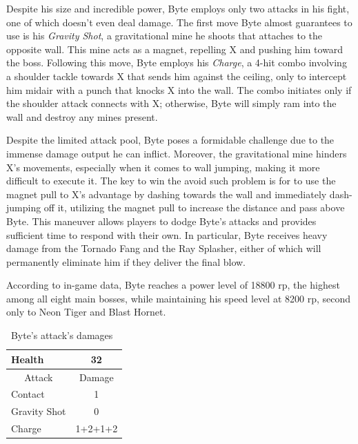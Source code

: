 Despite his size and incredible power, Byte employs only two attacks in his fight, one of which doesn't even deal damage. The first move Byte almost guarantees to use is his \emph{Gravity Shot}, a gravitational mine he shoots that attaches to the opposite wall. This mine acts as a magnet, repelling X and pushing him toward the boss. Following this move, Byte employs his \emph{Charge}, a 4-hit combo involving a shoulder tackle towards X that sends him against the ceiling, only to intercept him midair with a punch that knocks X into the wall. The combo initiates only if the shoulder attack connects with X; otherwise, Byte will simply ram into the wall and destroy any mines present.


Despite the limited attack pool, Byte poses a formidable challenge due to the immense damage output he can inflict. Moreover, the gravitational mine hinders X's movements, especially when it comes to wall jumping, making it more difficult to execute it. The key to win the avoid such problem is for to use the magnet pull to X's advantage by dashing towards the wall and immediately dash-jumping off it, utilizing the magnet pull to increase the distance and pass above Byte. This maneuver allows players to dodge Byte's attacks and provides sufficient time to respond with their own. In particular, Byte receives heavy damage from the Tornado Fang and the Ray Splasher, either of which will permanently eliminate him if they deliver the final blow.

According to in-game data, Byte reaches a power level of 18800 rp, the highest among all eight main bosses, while maintaining his speed level at 8200 rp, second only to Neon Tiger and Blast Hornet.

\begin{table}[htp]
	\centering
	\begin{tabular}[h]{l c}
		\toprule
		Health  & 32\\
		\midrule
		\multicolumn{1}{c}{Attack} & \multicolumn{1}{c}{Damage}\\
		Contact & 1\\
		Gravity Shot& 0\\
		Charge& 1+2+1+2\\
		\bottomrule
	\end{tabular}
	\caption{Byte's attack's damages~\cite{wiki:Byte,book:Compendium}}
\end{table} 

